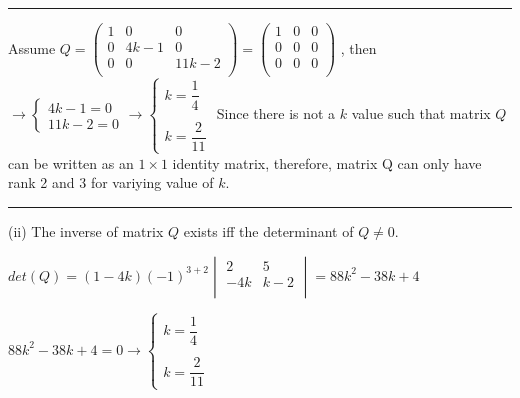 \documentclass[fleqn]{article}
\begin{document}
\begin{enumerate}
      \textcolor{hwColor}{
        \rule{16cm}{0.4pt}
      }

      \bigbreak

      \textcolor{hwColor}{
        Assume
        $
          Q=\begin{pmatrix}
          1 & 0 & 0 \\
          0 & 4k-1 & 0 \\
          0 & 0 & 11k-2 \\
        \end{pmatrix}=\begin{pmatrix}
          1 & 0 & 0 \\
          0 & 0 & 0 \\
          0 & 0 & 0 \\
        \end{pmatrix}
        $
        , then 
        $
         \longrightarrow
         \begin{cases}
           4k-1=0 \\
           11k-2=0  
         \end{cases}
         \longrightarrow
         \begin{cases}
           k=\dfrac{1}{4} \\
           \\
           k= \dfrac{2}{11} 
         \end{cases}
        $
        Since there is not a $k$ value such that matrix $Q$ can be written as an $1 \times 1$ identity matrix, therefore, matrix Q can only have rank 2 and 3 for variying value of $k$. 
      }

      \bigbreak

      \textcolor{hwColor}{
        \rule{16cm}{0.4pt}
      }

      \bigbreak

      \textcolor{hwColor}{
        (ii) The inverse of matrix $Q$ exists iff the determinant of $Q\neq0$.
      }

      \textcolor{hwColor}{
        $
        det(Q)=(1-4k)(-1)^{3+2}\begin{vmatrix}
          2 & 5 \\
          -4k & k-2 \\
        \end{vmatrix}
        =
        88k^2-38k+4
        $
      }

      \textcolor{hwColor}{
        $
        88k^2-38k+4=0
        \longrightarrow
        \begin{cases}
          k=\dfrac{1}{4} \\
          \\
          k= \dfrac{2}{11} 
        \end{cases}
        $
      }


\end{enumerate}
\end{document}

